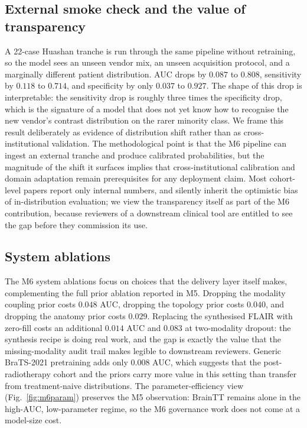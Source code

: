 \documentclass[11pt,a4paper]{article}
\begin{document}
\subsection{External smoke check and the value of transparency}\label{sec:external}

A 22-case Huashan tranche is run through the same pipeline without retraining, so the model sees an unseen vendor mix, an unseen acquisition protocol, and a marginally different patient distribution. AUC drops by $0.087$ to $0.808$, sensitivity by $0.118$ to $0.714$, and specificity by only $0.037$ to $0.927$. The shape of this drop is interpretable: the sensitivity drop is roughly three times the specificity drop, which is the signature of a model that does not yet know how to recognise the new vendor's contrast distribution on the rarer minority class. We frame this result deliberately as evidence of distribution shift rather than as cross-institutional validation. The methodological point is that the M6 pipeline can ingest an external tranche and produce calibrated probabilities, but the magnitude of the shift it surfaces implies that cross-institutional calibration and domain adaptation remain prerequisites for any deployment claim. Most cohort-level papers report only internal numbers, and silently inherit the optimistic bias of in-distribution evaluation; we view the transparency itself as part of the M6 contribution, because reviewers of a downstream clinical tool are entitled to see the gap before they commission its use.

\subsection{System ablations}

The M6 system ablations focus on choices that the delivery layer itself makes, complementing the full prior ablation reported in M5. Dropping the modality coupling prior costs $0.048$ AUC, dropping the topology prior costs $0.040$, and dropping the anatomy prior costs $0.029$. Replacing the synthesised FLAIR with zero-fill costs an additional $0.014$ AUC and $0.083$ at two-modality dropout: the synthesis recipe is doing real work, and the gap is exactly the value that the missing-modality audit trail makes legible to downstream reviewers. Generic BraTS-2021 pretraining adds only $0.008$ AUC, which suggests that the post-radiotherapy cohort and the priors carry more value in this setting than transfer from treatment-naive distributions. The parameter-efficiency view (Fig.~\ref{fig:m6param}) preserves the M5 observation: BrainTT remains alone in the high-AUC, low-parameter regime, so the M6 governance work does not come at a model-size cost.
\end{document}
